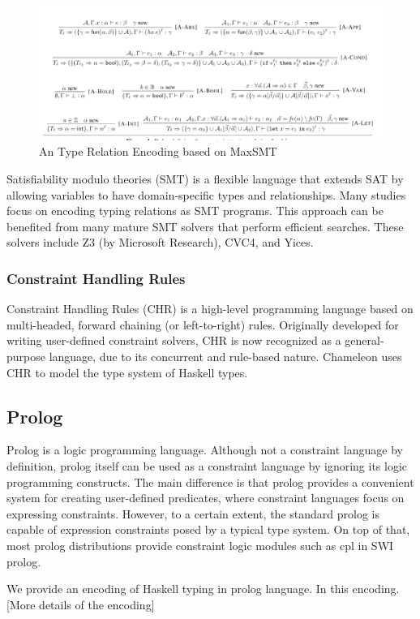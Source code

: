\begin{figure}[hbt]
  \includegraphics[width=\linewidth]{MaxSMT}
  \caption{An Type Relation Encoding based on MaxSMT}
\end{figure}

Satisfiability modulo theories (SMT) is a flexible language that extends SAT by allowing variables to have domain-specific types and relationships. Many studies focus on encoding typing relations as SMT programs. This approach can be benefited from many mature SMT solvers that perform efficient searches. These solvers include Z3 (by Microsoft Research), CVC4, and Yices.

\subsubsection{Constraint Handling Rules}
Constraint Handling Rules (CHR) is a high-level programming language based on multi-headed, forward chaining (or left-to-right) rules. Originally developed for writing user-defined constraint solvers, CHR is now recognized as a general-purpose language, due to its concurrent and rule-based nature. Chameleon uses CHR to model the type system of Haskell types.

\subsection{Prolog}
Prolog is a logic programming language. Although not a constraint language by definition, prolog itself can be used as a constraint language by ignoring its logic programming constructs. The main difference is that prolog provides a convenient system for creating user-defined predicates, where constraint languages focus on expressing constraints. However, to a certain extent, the standard prolog is capable of expression constraints posed by a typical type system. On top of that, most prolog distributions provide constraint logic modules such as cpl in SWI prolog.


We provide an encoding of Haskell typing in prolog language. In this encoding. [More details of the encoding]


